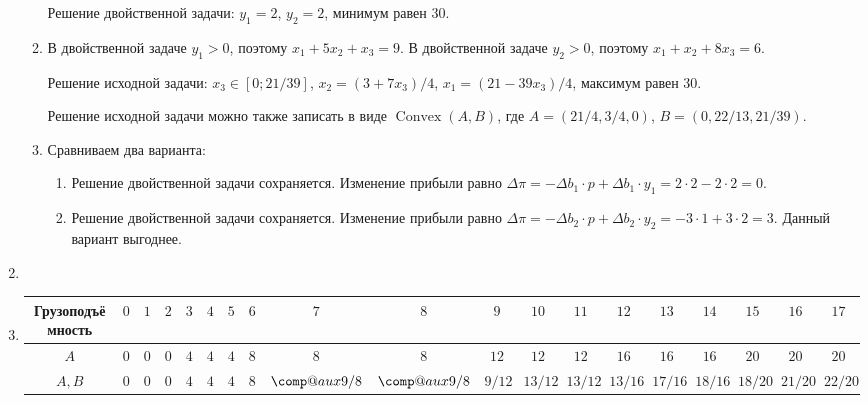 \documentclass[12pt]{article}
\makeatletter
\DeclareMathOperator{\Convex}{Convex}
\newcommand*\comp[2][]{%
  \ensuremath{%
    \mathbin{%
      \mathpalette{\comp@aux{#1}}{#2}%
    }%
  }%
}
\newcommand*{\comp@aux}[3]{%
  #2%
  \mskip.5\thinmuskip\nonscript\mskip-.25\thinmuskip
  \begingroup
    \sbox0{%
      $%
        \m@th %
        #2%
        \mkern9mu %
      $%
    }%
  \edef\x{\endgroup
    \comp@unit=\the\wd0 %
  }\x
  \tikz[baseline=(char.base)]{%
    \node[
      rectangle,
      draw,
      minimum height=2\comp@unit,
      minimum width=2\comp@unit,
      rounded corners=\comp@unit,
      inner sep=.33\comp@unit,
      line width=.05\comp@unit,
      #1%
    ] (char) {%
      $%
        \m@th %
        #2%
        \rule{0pt}{\comp@unit}%
        #3%
      $%
    };%
  }%
  \mskip.5\thinmuskip\nonscript\mskip-.25\thinmuskip
}
\makeatother
\begin{document}
\begin{enumerate}
\begin{enumerate}
    Решение двойственной задачи: $y_1 = 2$, $y_2 = 2$, минимум равен $30$.

    \item В двойственной задаче $y_1 > 0$, поэтому $x_1 + 5x_2 + x_3 = 9$. 
    В двойственной задаче $y_2 > 0$, поэтому $x_1 + x_2 + 8x_3 = 6$.
    
    Решение исходной задачи: $x_3 \in [0; 21/39]$, $x_2 = (3 + 7x_3) / 4$, $x_1 = (21 - 39 x_3) / 4$,  максимум равен $30$. 

    Решение исходной задачи можно также записать в виде $\Convex(A, B)$, где $A = (21/4, 3/4, 0)$, $B = (0, 22/13, 21/39)$.

    \item Сравниваем два варианта:    
    \begin{enumerate}
        \item Решение двойственной задачи сохраняется. 
        Изменение прибыли равно $\Delta \pi = - \Delta b_1 \cdot p + \Delta b_1 \cdot y_1 =  2 \cdot 2 - 2 \cdot 2 = 0$.
        \item Решение двойственной задачи сохраняется. 
        Изменение прибыли равно $\Delta \pi = - \Delta b_2 \cdot p + \Delta b_2 \cdot y_2 =  -3 \cdot 1 + 3 \cdot 2 = 3$.
        Данный вариант выгоднее. 
    \end{enumerate}
\end{enumerate}

    \item 
    \item 
    \begin{tiny}
        \begin{tabular}{ccccccccccccccccccc}
        \toprule
        Грузоподъёмность & $0$ & $1$ & $2$ & $3$ & $4$ & $5$ & $6$ & $7$ & $8$ & $9$ & $10$ & $11$ & $12$ & $13$ & $14$ & $15$ & $16$ & $17$ \\
        \midrule
        $A$ & $0$ & $0$ & $0$ & $4$ & $4$ & $4$ & $8$ & $8$ & $8$ & $12$ & $12$ & $12$ & $16$ & $16$ & $16$ & $20$ & $20$ & $20$ \\
        $A, B$ & $0$ & $0$ & $0$ & $4$ & $4$ & $4$ & $8$ & $\comp{9}/8$ & $\comp{9}/8$ & $9/12$ & $13/12$ & $13/12$ & $13/16$ & $17/16$ & $18/16$ & $18/20$ & $21/20$ & $22/20$ \\
        \bottomrule
      \end{tabular}
      \end{tiny}


\end{enumerate}
\end{document}
